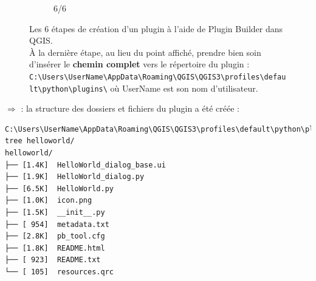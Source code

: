 \documentclass[11pt]{article}
\begin{document}
\begin{enumerate}
\begin{minipage}[t]{0.9\paperwidth}
\begin{figure}[H]
\begin{subfigure}[t]{0.32\textwidth}
        \caption{6/6}\label{pluginbuilder:6}
    \end{subfigure}
    \caption[Les 6 étapes de création d'un plugin à l'aide de \og{}Plugin Builder\fg{} dans QGIS.]{Les 6 étapes de création d'un plugin à l'aide de \og{}Plugin Builder\fg{} dans QGIS. \\
    À la dernière étape, au lieu du point affiché, prendre bien soin d'insérer le \textbf{chemin complet} vers le répertoire du plugin : \texttt{C:\textbackslash{}Users\textbackslash{}\textcolor{mygreen}{UserName}\textbackslash{}AppData\textbackslash{}Roaming\textbackslash{}QGIS\textbackslash{}QGIS3\textbackslash{}profiles\textbackslash{}default\textbackslash{}python\textbackslash{}plugins\textbackslash{}}  où \textcolor{mygreen}{UserName} est son nom d'utilisateur.}
    \label{pluginbuilder}
\end{figure}
\end{minipage}
\vspace*{-1em}



$\Rightarrow$ \underline{}: la structure des dossiers et fichiers du plugin a été créée :
\vspace*{-2em}
\begin{center}
\begin{minipage}[t]{0.96\textwidth}
\begin{verbatim}
C:\Users\UserName\AppData\Roaming\QGIS\QGIS3\profiles\default\python\plugins> tree helloworld/
helloworld/
├── [1.4K]  HelloWorld_dialog_base.ui
├── [1.9K]  HelloWorld_dialog.py
├── [6.5K]  HelloWorld.py
├── [1.0K]  icon.png
├── [1.5K]  __init__.py
├── [ 954]  metadata.txt
├── [2.8K]  pb_tool.cfg
├── [1.8K]  README.html
├── [ 923]  README.txt
└── [ 105]  resources.qrc
\end{verbatim}
\end{minipage}
\end{center}





\newpage{}


\end{enumerate}
\end{document}
